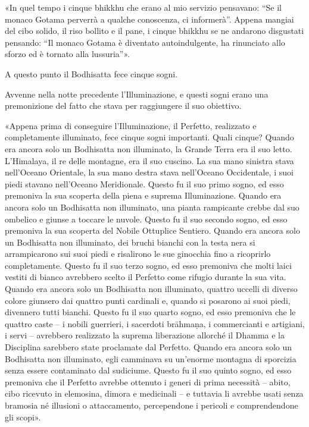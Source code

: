 «In quel tempo i cinque bhikkhu che erano al mio servizio pensavano: “Se il
monaco Gotama perverrà a qualche conoscenza, ci informerà”. Appena mangiai del
cibo solido, il riso bollito e il pane, i cinque bhikkhu se ne andarono
disgustati pensando: “Il monaco Gotama è diventato autoindulgente, ha rinunciato
allo sforzo ed è tornato alla lussuria”».


 A questo punto il Bodhisatta fece cinque sogni.

 Avvenne nella notte precedente l’Illuminazione, e
questi sogni erano una premonizione del fatto che stava per raggiungere il suo
obiettivo.

 «Appena prima di conseguire l’Illuminazione, il Perfetto,
realizzato e completamente illuminato, fece cinque sogni importanti. Quali
cinque? Quando era ancora solo un Bodhisatta non illuminato, la Grande Terra era
il suo letto. L’Himalaya, il re delle montagne, era il suo cuscino. La sua mano
sinistra stava nell’Oceano Orientale, la sua mano destra stava nell’Oceano
Occidentale, i suoi piedi stavano nell’Oceano Meridionale. Questo fu il suo
primo sogno, ed esso premoniva la sua scoperta della piena e suprema
Illuminazione. Quando era ancora solo un Bodhisatta non illuminato, una pianta
rampicante crebbe dal suo ombelico e giunse a toccare le nuvole. Questo fu il
suo secondo sogno, ed esso premoniva la sua scoperta del Nobile Ottuplice
Sentiero. Quando era ancora solo un Bodhisatta non illuminato, dei bruchi
bianchi con la testa nera si arrampicarono sui suoi piedi e risalirono le sue
ginocchia fino a ricoprirlo completamente. Questo fu il suo terzo sogno, ed esso
premoniva che molti laici vestiti di bianco avrebbero scelto il Perfetto come
rifugio durante la sua vita. Quando era ancora solo un Bodhisatta non
illuminato, quattro uccelli di diverso colore giunsero dai quattro punti
cardinali e, quando si posarono ai suoi piedi, divennero tutti bianchi. Questo
fu il suo quarto sogno, ed esso premoniva che le quattro caste – i nobili
guerrieri, i sacerdoti brāhmaṇa, i commercianti e artigiani, i servi – avrebbero
realizzato la suprema liberazione allorché il Dhamma e la Disciplina sarebbero
state proclamate dal Perfetto. Quando era ancora solo un Bodhisatta non
illuminato, egli camminava su un’enorme montagna di sporcizia senza essere
contaminato dal sudiciume. Questo fu il suo quinto sogno, ed esso premoniva che
il Perfetto avrebbe ottenuto i generi di prima necessità – abito, cibo ricevuto
in elemosina, dimora e medicinali – e tuttavia li avrebbe usati senza bramosia
né illusioni o attaccamento, percependone i pericoli e comprendendone gli
scopi».

